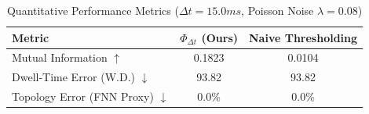\begin{table}[ht]
\centering
\caption{Quantitative Performance Metrics ($\Delta t = 15.0ms$, Poisson Noise $\lambda = 0.08$)}
\label{tab:quantitative_metrics}
\begin{tabular}{@{}lcc@{}}
\toprule
\textbf{Metric} & \textbf{$\Phi_{\Delta t}$ (Ours)} & \textbf{Naive Thresholding} \\ \midrule
Mutual Information $\uparrow$ & 0.1823 & 0.0104 \\
Dwell-Time Error (W.D.) $\downarrow$ & 93.82 & 93.82 \\
Topology Error (FNN Proxy) $\downarrow$ & 0.0\% & 0.0\% \\ \bottomrule
\end{tabular}
\end{table}
